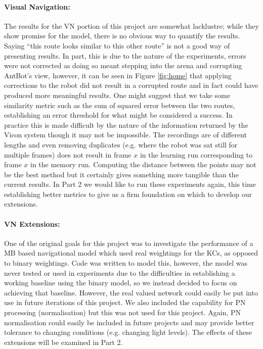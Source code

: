 \documentclass[a4paper,11pt,twoside,openright]{article}
\begin{document}
\paragraph{Visual Navigation:}
The results for the VN portion of this project are somewhat lacklustre; while they show promise for the model,
there is no obvious way to quantify the results. Saying ``this route looks similar to this other route'' is
not a good way of presenting results. In part, this is due to the nature of the experiments, errors were
not corrected as doing so meant stepping into the arena and corrupting AntBot's view, however, it can
be seen in Figure \ref{fig:home} that applying corrections to the robot did not result in a corrupted route
and in fact could have produced more meaningful results. One might suggest that we take some similarity metric
such as the sum of squared error between the two routes, establishing an error threshold for what might be
considered a success. In practice this is made difficult by the nature of the information returned by the
Vicon system though it may not be impossible. The recordings are of different lengths and even removing
duplicates (e.g. where the robot was sat still for multiple frames) does not result in frame $x$ in the
learning run corresponding to frame $x$ in the memory run. Computing the distance between the points
may not be the best method but it certainly gives something more tangible than the current results. In Part 2
we would like to run these experiments again, this time establishing better metrics to give us a firm foundation
on which to develop our extensions.
\newline

\paragraph{VN Extensions:}
One of the original goals for this project was to investigate the performance of a MB based navigational
model which used real weightings for the KCs, as opposed to binary weightings. Code was written
to model this, however, the model was never tested or used in experiments due to the difficulties in
establishing a working baseline using the binary model, so we instead decided to focus on achieving that
baseline. However, the real valued network could easily be put into use in future iterations of this project.
We also included the capability for PN processing (normalisation) but this was not used for this project.
Again, PN normalisation could easily be included in future projects and may provide better tolerance to
changing conditions (e.g. changing light levels). The effects of these extensions will be examined
in Part 2.
\newline
\end{document}
